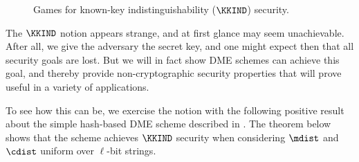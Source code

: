 \begin{figure}[t]
\center
{}
\caption{Games for known-key indistinguishability ($\KKIND$) security.}
\label{fig:kkind-games}
\end{figure}


The $\KKIND$ notion appears strange, and at first glance may seem unachievable. 
After all, we give the adversary the secret key, and one might expect then that
all security goals are lost. But we will in fact show DME schemes can 
achieve this goal, and thereby provide non-cryptographic security properties
that will prove useful in a variety of applications. 

To see how this can be, we exercise the notion with the following positive
result about the simple hash-based DME scheme described in
. The theorem below shows that the scheme achieves
$\KKIND$ security when considering $\mdist$ and $\cdist$ uniform over $\ell$-bit strings. 


